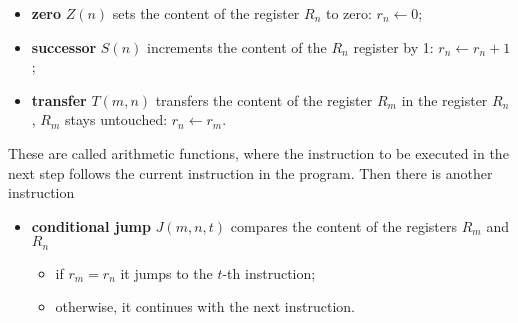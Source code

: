 \begin{itemize}

\item \textbf{zero} $Z(n)$ sets the content of the register $R_n$ to zero: $r_n \leftarrow 0$;

\item \textbf{successor} $S(n)$ increments the content of the $R_n$ register by 1: $r_n \leftarrow r_n+1$;

\item \textbf{transfer} $T(m,n)$ transfers the content of the register $R_m$ in the register $R_n$, $R_m$ stays untouched: $r_n\leftarrow r_m$.
\end{itemize}
These are called arithmetic functions, where the instruction to be executed in the next step
 follows the current instruction in the program.
Then there is another instruction
\begin{itemize}
\item \textbf{conditional jump} $J(m,n,t)$ compares the content of the registers $R_m$ and $R_n$
  \begin{itemize}
  \item if $r_m = r_n$ it jumps to the $t$-th instruction;
  \item otherwise, it continues with the next instruction.
  \end{itemize}
\end{itemize}


